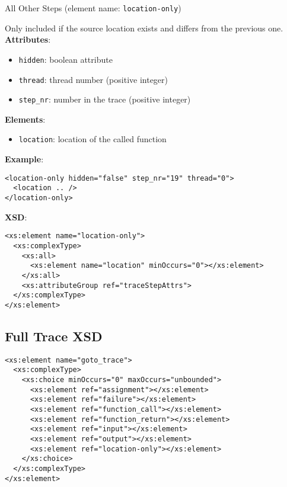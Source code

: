 \documentclass[12pt]{article}
\begin{document}
\begin{center}
  {\Large All Other Steps} (element name: \texttt{location-only})
\end{center}

\noindent Only included if the source location exists and differs from the previous one.\\

\noindent\textbf{Attributes}:
\begin{itemize}
\item \texttt{hidden}: boolean attribute
\item \texttt{thread}: thread number (positive integer)
\item \texttt{step\_nr}: number in the trace (positive integer)
\end{itemize}

\noindent\textbf{Elements}:
\begin{itemize}
\item \texttt{location}: location of the called function
\end{itemize}

\noindent\textbf{Example}:
\begin{verbatim}
<location-only hidden="false" step_nr="19" thread="0">
  <location .. />
</location-only>
\end{verbatim}

\noindent\textbf{XSD}:
\begin{verbatim}
<xs:element name="location-only">
  <xs:complexType>
    <xs:all>
      <xs:element name="location" minOccurs="0"></xs:element>
    </xs:all>
    <xs:attributeGroup ref="traceStepAttrs">
  </xs:complexType>
</xs:element>
\end{verbatim}

\subsection{Full Trace XSD}

\begin{verbatim}
<xs:element name="goto_trace">
  <xs:complexType>
    <xs:choice minOccurs="0" maxOccurs="unbounded">
      <xs:element ref="assignment"></xs:element>
      <xs:element ref="failure"></xs:element>
      <xs:element ref="function_call"></xs:element>
      <xs:element ref="function_return"></xs:element>
      <xs:element ref="input"></xs:element>
      <xs:element ref="output"></xs:element>
      <xs:element ref="location-only"></xs:element>
    </xs:choice>
  </xs:complexType>
</xs:element>
\end{verbatim}
\end{document}
